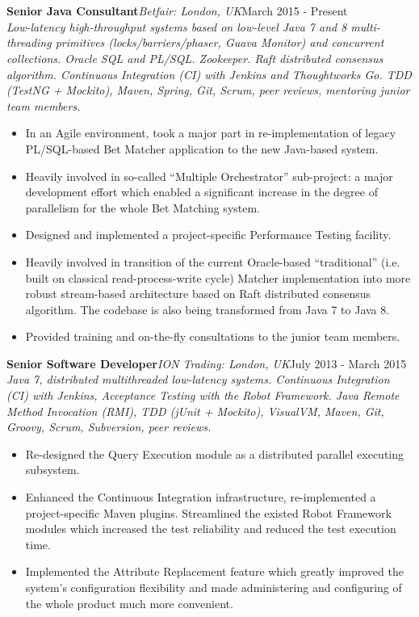 \documentclass{res}
\newcommand{\jobdes}[4]{\needspace{3\baselineskip} %
{\noindent \bf #3\hspace{2ex}}{{\em \small #1}}{\hfill #2}\\{{\it \small #4.}}}
\newcommand{\osection}[1]{\section{\sc {\Large \textbf{#1}\\}} \vspace{0.30cm}}
\begin{document}
\begin{resume}
\begin{itemize}
\end{itemize}

\osection{Career History}
\jobdes{Betfair: London, UK} {March 2015 - Present}{Senior Java Consultant}
{Low-latency high-throughput systems based on low-level Java 7 and 8 multi-threading primitives (locks/barriers/phaser, Guava Monitor) and concurrent collections. Oracle SQL and PL/SQL. Zookeeper. Raft distributed consensus algorithm. Continuous Integration (CI) with Jenkins and Thoughtworks Go. TDD (TestNG + Mockito), Maven, Spring, Git, Scrum, peer reviews, mentoring junior team members}
\begin{itemize}
 \item In an Agile environment, took a major part in re-implementation of legacy PL/SQL-based Bet Matcher application to the new Java-based system.
 \item Heavily involved in so-called ``Multiple Orchestrator'' sub-project: a major development effort which enabled a significant increase in the degree of parallelism for the whole Bet Matching system.
 \item Designed and implemented a project-specific Performance Testing facility.
 \item Heavily involved in transition of the current Oracle-based ``traditional'' (i.e. built on classical read-process-write cycle) Matcher implementation into more robust stream-based architecture based on Raft distributed consensus algorithm. The codebase is also being transformed from Java 7 to Java 8.
 \item Provided training and on-the-fly consultations to the junior team members.
 \end{itemize}

\jobdes{ION Trading: London, UK} {July 2013 - March 2015}{Senior Software Developer}
{Java 7, distributed multithreaded low-latency systems. Continuous Integration (CI) with Jenkins, Acceptance Testing with the Robot Framework. Java Remote Method Invocation (RMI), TDD (jUnit + Mockito), VisualVM, Maven, Git, Groovy, Scrum, Subversion, peer reviews}
\begin{itemize}
 \item Re-designed the Query Execution module as a distributed parallel executing subsystem.
 \item Enhanced the Continuous Integration infrastructure, re-implemented a project-specific Maven plugins. Streamlined the existed Robot Framework modules which increased the test reliability and reduced the test execution time.
 \item Implemented the Attribute Replacement feature which greatly improved the system’s configuration flexibility and made administering and configuring of the whole product much more convenient.
 \end{itemize}


\end{resume}
\end{document}
